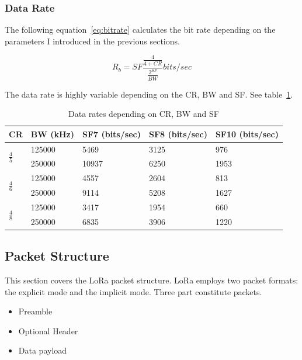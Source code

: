 \subsubsection{Data Rate}

The following equation~\ref{eq:bitrate} calculates the bit rate depending on the
parameters I introduced in the previous sections\cite{semtech:modulationbasics}.

\begin{equation}
 \label{eq:bitrate} 
  R_{b} = SF \frac{\frac{4}{4 + CR}}{\frac{2^{SF}}{BW}} bits/sec
\end{equation}

The data rate is highly variable depending on the CR, BW and SF.
See table~\ref{table:datarate}.

\begin{table}[h!]
\centering
\begin{tabular}{@{}lllll@{}}
\toprule
CR & BW (kHz) & SF7 (bits/sec) & SF8 (bits/sec) & SF10 (bits/sec) \\ \midrule
\multirow{2}{*}{$\frac{4}{5}$} & 125000   & 5469           & 3125           & 976             \\
  & 250000   & 10937          & 6250           & 1953            \\
\multirow{2}{*}{$\frac{4}{6}$} & 125000   & 4557           & 2604           & 813             \\
  & 250000   & 9114           & 5208           & 1627            \\
\multirow{2}{*}{$\frac{4}{8}$} & 125000   & 3417           & 1954           & 660             \\
  & 250000   & 6835           & 3906           & 1220            \\ \bottomrule
\end{tabular}
\caption{Data rates depending on CR, BW and SF\label{table:datarate}}
\end{table}

\subsection{Packet Structure}

This section covers the LoRa packet structure. LoRa employs two packet formats: 
the explicit mode and the implicit mode.
Three part constitute packets.

\begin{itemize}
  \item Preamble
  \item Optional Header
  \item Data payload
\end{itemize}

